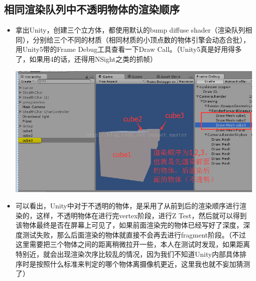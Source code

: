 \documentclass[9pt, b5paper]{article}
\begin{document}
\subsection{相同渲染队列中不透明物体的渲染顺序}
\label{sec-2-3}
\begin{itemize}
\item 拿出Unity，创建三个立方体，都使用默认的bump diffuse shader（渲染队列相同），分别给三个不同的材质（相同材质的小顶点数的物体引擎会动态合批），用Unity5带的Frame Debug工具查看一下Draw Call。（Unity5真是好用得多了，如果用4的话，还得用NSight之类的抓帧）

\includegraphics[width=.9\linewidth]{./pic/renderQueue1.png}
\item 可以看出，Unity中对于不透明的物体，是采用了从前到后的渲染顺序进行渲染的，这样，不透明物体在进行完vertex阶段，进行Z Test，然后就可以得到该物体最终是否在屏幕上可见了，如果前面渲染完的物体已经写好了深度，深度测试失败，那么后面渲染的物体就直接不会再去进行fragment阶段。（不过这里需要把三个物体之间的距离稍微拉开一些，本人在测试时发现，如果距离特别近，就会出现渲染次序比较乱的情况，因为我们不知道Unity内部具体排序时是按照什么标准来判定的哪个物体离摄像机更近，这里我也就不妄加猜测了）
\end{itemize}
\end{document}
